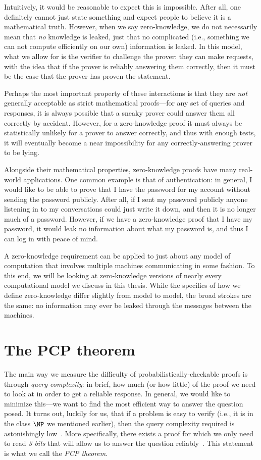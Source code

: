 \documentclass[english,12pt]{reedthesis}
\theoremstyle{plain}
\theoremstyle{definition}
\theoremstyle{remark}
\begin{document}
Intuitively, it would be reasonable to expect this is impossible. After all, one
definitely cannot just state something and expect people to believe it is a
mathematical truth. However, when we say zero-knowledge, we do not necessarily
mean that \emph{no} knowledge is leaked, just that no complicated (i.e.,
something we can not compute efficiently on our own) information is leaked. In
this model, what we allow for is the verifier to challenge the prover: they can
make requests, with the idea that if the prover is reliably answering them
correctly, then it must be the case that the prover has proven the statement.

Perhaps the most important property of these interactions is that they are
\emph{not} generally acceptable as strict mathematical proofs---for any set of
queries and responses, it is always possible that a sneaky prover could answer
them all correctly by accident. However, for a zero-knowledge proof it must
always be statistically unlikely for a prover to answer correctly, and thus with
enough tests, it will eventually become a near impossibility for any
correctly-answering prover to be lying.

Alongside their mathematical properties, zero-knowledge proofs have many
real-world applications. One common example is that of authentication: in
general, I would like to be able to prove that I have the password for my
account without sending the password publicly. After all, if I sent my password
publicly anyone listening in to my conversations could just write it down, and
then it is no longer much of a password. However, if we have a zero-knowledge
proof that I have my password, it would leak no information about what my
password is, and thus I can log in with peace of mind.

A zero-knowledge requirement can be applied to just about any model of
computation that involves multiple machines communicating in some fashion. To
this end, we will be looking at zero-knowledge versions of nearly every
computational model we discuss in this thesis. While the specifics of how we
define zero-knowledge differ slightly from model to model, the broad strokes are
the same: no information may ever be leaked through the messages between the
machines.

\section{The PCP theorem}

The main way we measure the difficulty of probabilistically-checkable proofs is
through \emph{query complexity}: in brief, how much (or how little) of the proof
we need to look at in order to get a reliable response. In general, we would
like to minimize this---we want to find the most efficient way to answer the
question posed. It turns out, luckily for us, that if a problem is easy to
verify (i.e., it is in the class $\NP$ we mentioned earlier), then the query
complexity required is astonishingly low~\cite{AS98}. More specifically, there
exists a proof for which we only need to read \emph{3 bits} that will allow us
to answer the question reliably~\cite{Has97}. This statement is what we call the
\emph{PCP theorem}.
\end{document}
